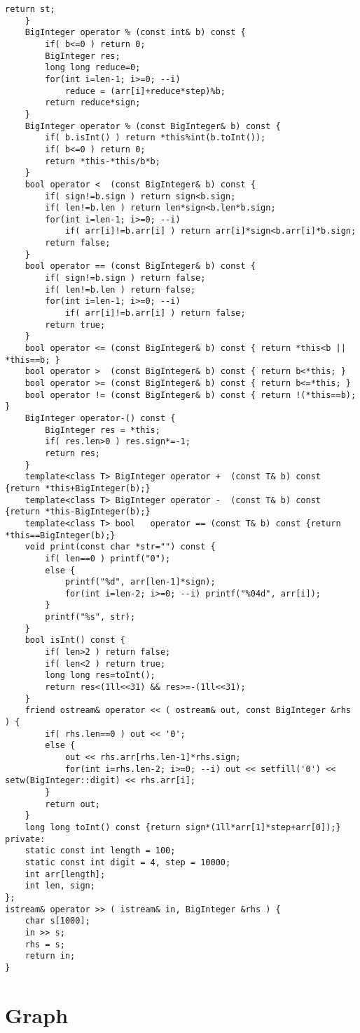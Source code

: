 \documentclass[11pt,twocolumn,a4paper]{article}
\begin{document}
\begin{lstlisting}[label=BigInteger]
		return st;
	}
	BigInteger operator % (const int& b) const {
		if( b<=0 ) return 0;
		BigInteger res;
		long long reduce=0;
		for(int i=len-1; i>=0; --i)
			reduce = (arr[i]+reduce*step)%b;
		return reduce*sign;
	}
	BigInteger operator % (const BigInteger& b) const {
		if( b.isInt() ) return *this%int(b.toInt());
		if( b<=0 ) return 0;
		return *this-*this/b*b;
	}
	bool operator <  (const BigInteger& b) const {
		if( sign!=b.sign ) return sign<b.sign;
		if( len!=b.len ) return len*sign<b.len*b.sign;
		for(int i=len-1; i>=0; --i)
			if( arr[i]!=b.arr[i] ) return arr[i]*sign<b.arr[i]*b.sign;
		return false;
	}
	bool operator == (const BigInteger& b) const {
		if( sign!=b.sign ) return false;
		if( len!=b.len ) return false;
		for(int i=len-1; i>=0; --i)
			if( arr[i]!=b.arr[i] ) return false;
		return true;
	}
	bool operator <= (const BigInteger& b) const { return *this<b || *this==b; }
	bool operator >  (const BigInteger& b) const { return b<*this; }
	bool operator >= (const BigInteger& b) const { return b<=*this; }
	bool operator != (const BigInteger& b) const { return !(*this==b); }
	BigInteger operator-() const {
		BigInteger res = *this;
		if( res.len>0 ) res.sign*=-1;
		return res;
	}
	template<class T> BigInteger operator +  (const T& b) const {return *this+BigInteger(b);}
	template<class T> BigInteger operator -  (const T& b) const {return *this-BigInteger(b);}
	template<class T> bool   operator == (const T& b) const {return *this==BigInteger(b);}
	void print(const char *str="") const {
		if( len==0 ) printf("0");
		else {
			printf("%d", arr[len-1]*sign);
			for(int i=len-2; i>=0; --i) printf("%04d", arr[i]);
		}
		printf("%s", str);
	}
	bool isInt() const {
		if( len>2 ) return false;
		if( len<2 ) return true;
		long long res=toInt();
		return res<(1ll<<31) && res>=-(1ll<<31);
	}
	friend ostream& operator << ( ostream& out, const BigInteger &rhs ) {
		if( rhs.len==0 ) out << '0';
		else {
			out << rhs.arr[rhs.len-1]*rhs.sign;
			for(int i=rhs.len-2; i>=0; --i) out << setfill('0') << setw(BigInteger::digit) << rhs.arr[i];
		}
		return out;
	}
	long long toInt() const {return sign*(1ll*arr[1]*step+arr[0]);}
private:
	static const int length = 100;
	static const int digit = 4, step = 10000;
	int arr[length];
	int len, sign;
};
istream& operator >> ( istream& in, BigInteger &rhs ) {
	char s[1000];
	in >> s;
	rhs = s;
	return in;
}
\end{lstlisting}


\newpage
\section{Graph}
\end{document}
